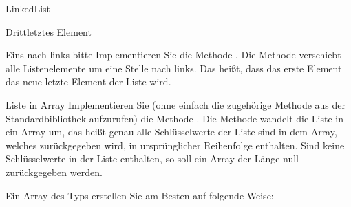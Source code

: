 \documentclass{../tuda-exercise}
\begin{document}
\begin{task}{LinkedList}
\begin{subtask*}[credit=\stars{2}{3}]{Drittletztes Element}
      \begin{solution}
        
      \end{solution}
    \end{subtask*}

    \clearpagesolution

    \begin{subtask*}[credit=\stars{2}{3}]{Eins nach links bitte}
      Implementieren Sie die Methode . Die Methode verschiebt
      alle Listenelemente um eine Stelle nach links. Das heißt, dass das erste Element das neue
      letzte Element der Liste wird.

      \begin{solution}
        
      \end{solution}
    \end{subtask*}

    \clearpagesolution

    \begin{subtask*}[credit=\stars{2}{3}]{Liste in Array}
      Implementieren Sie (ohne einfach die zugehörige Methode aus der Standardbibliothek
      aufzurufen) die Methode . Die Methode wandelt
      die Liste in ein Array um, das heißt genau alle Schlüsselwerte der Liste sind in dem Array,
      welches zurückgegeben wird, in ursprünglicher Reihenfolge enthalten. Sind keine
      Schlüsselwerte in der Liste enthalten, so soll ein Array der Länge null zurückgegeben werden.

      \begin{note}[title=Tipp:, color=tuda-orange]
        Ein Array des Typs  erstellen Sie am Besten auf folgende Weise:

        \begin{center}
          \href{https://docs.oracle.com/en/java/javase/11/docs/api/java.base/java/lang/reflect/Array.html#newInstance(java.lang.Class,int)}
          {}
        \end{center}
      \end{note}

      \begin{solution}
        
      \end{solution}
    \end{subtask*}


\end{task}
\end{document}
